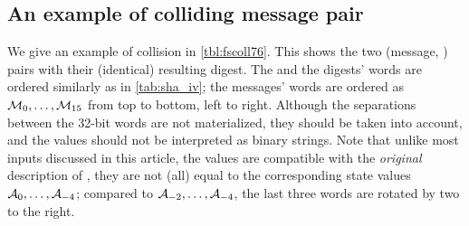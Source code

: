 \subsection{An example of colliding message pair}
\label{sec:colli_ex76}
We give an example of collision in \autoref{tbl:fscoll76}.
This shows the two (message, \iv) pairs with their (identical) resulting digest. The \ivs and the digests' words are ordered similarly
as in \autoref{tab:sha_iv}; the messages' words are ordered as $\mathcal{M}_0,\ldots,\mathcal{M}_{15}$ from top to bottom, left to right.
Although the separations between the 32-bit words are not materialized, they should be taken into account, and
the values should not be interpreted as binary strings.
Note that unlike most inputs discussed in this article, the \iv values are compatible with the \emph{original} description
of \shaone, \ie they are not (all) equal to the corresponding state values $\mathcal{A}_{0},\ldots,\mathcal{A}_{-4}$; compared to
$\mathcal{A}_{-2},\ldots,\mathcal{A}_{-4}$, the last three \iv words are rotated by two to the right.

